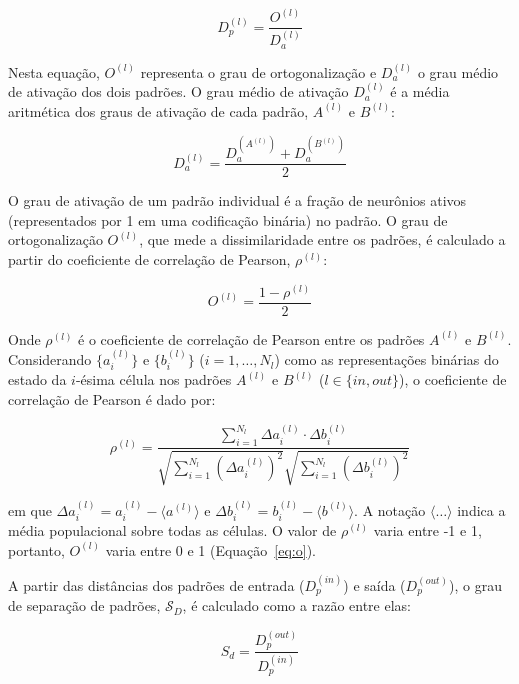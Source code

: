 \begin{equation}
    \label{eq:dp}
    D_p^{(l)} = \frac{O^{(l)}}{D_a^{(l)}}
\end{equation}

Nesta equação, $O^{(l)}$ representa o grau de ortogonalização e $D_a^{(l)}$ o grau médio de ativação dos dois padrões. O grau médio de ativação $D_a^{(l)}$ é a média aritmética dos graus de ativação de cada padrão, $A^{(l)}$ e $B^{(l)}$:

\begin{equation}
    \label{eq:da}
    D_a^{(l)} = \frac{D_a^{(A^{(l)})} + D_a^{(B^{(l)})}}{2}
\end{equation}

O grau de ativação de um padrão individual é a fração de neurônios ativos (representados por 1 em uma codificação binária) no padrão.
O grau de ortogonalização $O^{(l)}$, que mede a dissimilaridade entre os padrões, é calculado a partir do coeficiente de correlação de Pearson, $\rho^{(l)}$:

\begin{equation}
    \label{eq:o}
    O^{(l)} = \frac{1 - \rho^{(l)}}{2}
\end{equation}

Onde $\rho^{(l)}$ é o coeficiente de correlação de Pearson entre os padrões $A^{(l)}$ e $B^{(l)}$.
Considerando $\{a_i^{(l)}\}$ e $\{b_i^{(l)}\}$ ($i=1, \dots, N_l$) como as representações binárias do estado da $i$-ésima célula nos padrões $A^{(l)}$ e $B^{(l)}$ ($l \in \{in, out\}$), o coeficiente de correlação de Pearson é dado por:

\begin{equation}
    \label{eq:pearson}
    \rho^{(l)} = \frac{\sum_{i=1}^{N_l} \Delta a_i^{(l)} \cdot \Delta b_i^{(l)}}{\sqrt{\sum_{i=1}^{N_l} (\Delta a_i^{(l)})^2} \sqrt{\sum_{i=1}^{N_l} (\Delta b_i^{(l)})^2}}
\end{equation}

em que $\Delta a_i^{(l)} = a_i^{(l)} - \langle a^{(l)} \rangle$ e $\Delta b_i^{(l)} = b_i^{(l)} - \langle b^{(l)} \rangle$. A
notação $\langle \dots \rangle$ indica a média populacional sobre todas as células. O valor de $\rho^{(l)}$ varia entre -1 e 1,
portanto, $O^{(l)}$ varia entre 0 e 1 (Equação~\ref{eq:o}).

A partir das distâncias dos padrões de entrada ($D_p^{(in)}$) e saída ($D_p^{(out)}$), o grau de separação de padrões, $\mathcal{S}_D$, é calculado como a razão entre elas:

\begin{equation}
    \label{eq:sd}
    S_d = \frac{D_p^{(out)}}{D_p^{(in)}}
\end{equation}

